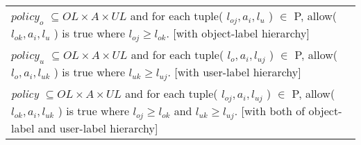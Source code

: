 \begin{table*}[t]
\begin{tabular}{p{\textwidth}}
		\emph{$policy_{o}$} $ \subseteq OL \times A \times UL$ and for each tuple( $l_{oj}, a_{i}, l_{u}$ ) $\in$ P, allow(  $l_{ok}, a_{i}, l_{u}$ ) is true where $l_{oj} \ge l_{ok}$. [with object-label hierarchy] \\
		
		\emph{$policy_{u}$} $ \subseteq OL \times A \times UL$ and for each tuple( $l_{o}, a_{i}, l_{uj}$ ) $\in$ P, allow(  $l_{o}, a_{i}, l_{uk}$ ) is true where $l_{uk} \ge l_{uj}$. [with user-label hierarchy] \\
		
		\emph{policy} $ \subseteq OL \times A \times UL$ and for each tuple( $l_{oj}, a_{i}, l_{uj}$ ) $\in$ P, allow(  $l_{ok}, a_{i}, l_{uk}$ ) is true where $l_{oj} \ge l_{ok}$ and $l_{uk} \ge l_{uj}$. [with both of object-label and user-label hierarchy] \\
		
		\hline
	\end{tabular}
\end{table*}

